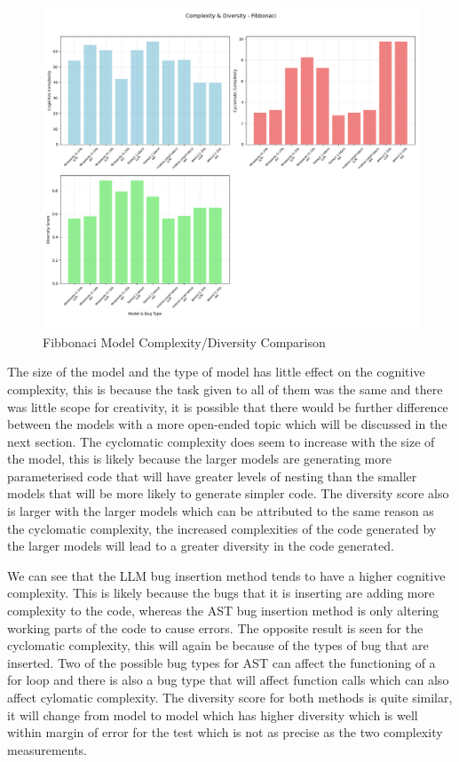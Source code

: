 \documentclass[12pt]{extarticle}
\begin{document}
\begin{figure}[H]
\centering
\includegraphics[width=0.7\linewidth]{Images/Complexity_Comparison_Fibbonaci.png}
\caption{Fibbonaci Model Complexity/Diversity Comparison}
\label{fig:Complexity_Benchmark}
\end{figure}

The size of the model and the type of model has little effect on the cognitive complexity, this is because the task given to all of them was the same and there was little scope for creativity, it is possible that there would be further difference between the models with a more open-ended topic which will be discussed in the next section. The cyclomatic complexity does seem to increase with the size of the model, this is likely because the larger models are generating more parameterised code that will have greater levels of nesting than the smaller models that will be more likely to generate simpler code. The diversity score also is larger with the larger models which can be attributed to the same reason as the cyclomatic complexity, the increased complexities of the code generated by the larger models will lead to a greater diversity in the code generated.

We can see that the LLM bug insertion method tends to have a higher cognitive complexity. This is likely because the bugs that it is inserting are adding more complexity to the code, whereas the AST bug insertion method is only altering working parts of the code to cause errors. The opposite result is seen for the cyclomatic complexity, this will again be because of the types of bug that are inserted. Two of the possible bug types for AST can affect the functioning of a for loop and there is also a bug type that will affect function calls which can also affect cylomatic complexity. The diversity score for both methods is quite similar, it will change from model to model which has higher diversity which is well within margin of error for the test which is not as precise as the two complexity measurements.
\end{document}

